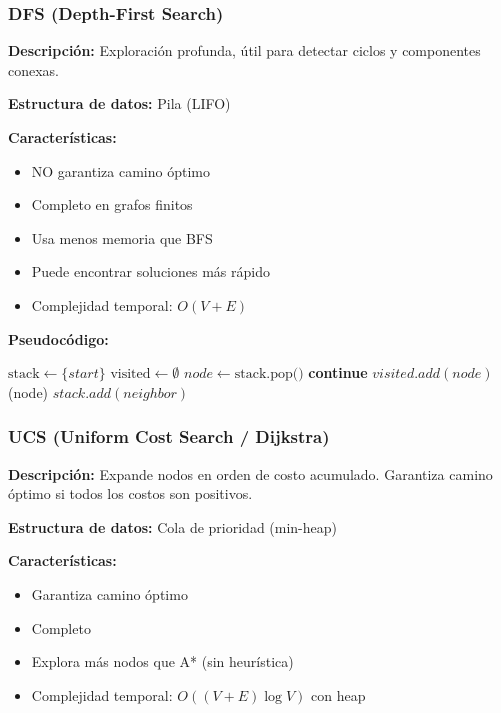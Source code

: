\documentclass[12pt,a4paper]{article}
\begin{document}
\subsubsection{DFS (Depth-First Search)}

\textbf{Descripción:} Exploración profunda, útil para detectar ciclos y componentes conexas.

\textbf{Estructura de datos:} Pila (LIFO)

\textbf{Características:}
\begin{itemize}
    \item NO garantiza camino óptimo
    \item Completo en grafos finitos
    \item Usa menos memoria que BFS
    \item Puede encontrar soluciones más rápido
    \item Complejidad temporal: $O(V + E)$
\end{itemize}

\textbf{Pseudocódigo:}
\begin{algorithm}[H]
\caption{DFS}
\begin{algorithmic}
\State $\text{stack} \gets \{start\}$
\State $\text{visited} \gets \emptyset$
    \State $node \gets \text{stack.pop()}$
        \State \textbf{continue}
    \EndIf
    \State $visited.add(node)$
        \Return {}(node)
    \EndIf
            \State $stack.add(neighbor)$
        \EndIf
    \EndFor
\EndWhile
\end{algorithmic}
\end{algorithm}

\subsubsection{UCS (Uniform Cost Search / Dijkstra)}

\textbf{Descripción:} Expande nodos en orden de costo acumulado. Garantiza camino óptimo si todos los costos son positivos.

\textbf{Estructura de datos:} Cola de prioridad (min-heap)

\textbf{Características:}
\begin{itemize}
    \item Garantiza camino óptimo
    \item Completo
    \item Explora más nodos que A* (sin heurística)
    \item Complejidad temporal: $O((V+E) \log V)$ con heap
\end{itemize}
\end{document}
